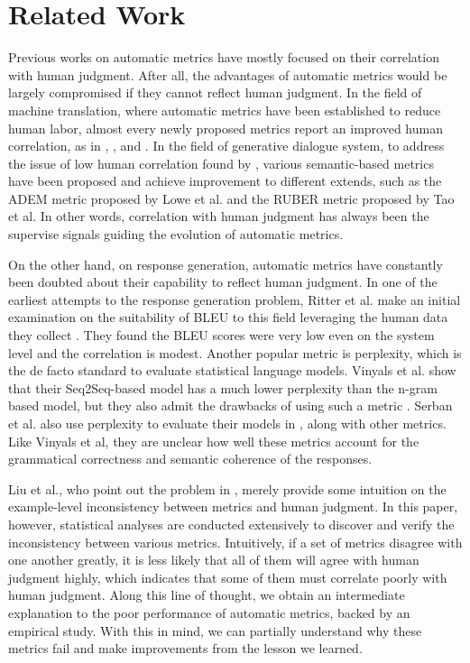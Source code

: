 \documentclass[runningheads]{llncs}
\begin{document}
    \section{Related Work}
    Previous works on automatic metrics have mostly focused on their correlation with human judgment. After all, the advantages of automatic metrics would be largely compromised if they cannot reflect human judgment. In the field of machine translation, where automatic metrics have been established to reduce human labor, almost every newly proposed metrics report an improved human correlation, as in \cite{NIST}, \cite{METEOR}, and \cite{chrf}. In the field of generative dialogue system, to address the issue of low human correlation found by \cite{HowNot}, various semantic-based metrics have been proposed and achieve improvement to different extends, such as the ADEM metric \cite{ADEM} proposed by Lowe et al. and the RUBER metric \cite{RUBER} proposed by Tao et al. In other words, correlation with human judgment has always been the supervise signals guiding the evolution of automatic metrics.

    On the other hand, on response generation, automatic metrics have constantly been doubted about their capability to reflect human judgment. In one of the earliest attempts to the response generation problem, Ritter et al. make an initial examination on the suitability of BLEU to this field leveraging the human data they collect \cite{Ritter11}. They found the BLEU scores were very low even on the system level and the correlation is modest. Another popular metric is perplexity, which is the de facto standard to evaluate statistical language models. Vinyals et al. show that their Seq2Seq-based model has a much lower perplexity than the n-gram based model, but they also admit the drawbacks of using such a metric \cite{GoogleChatbot}. Serban et al. also use perplexity to evaluate their models in \cite{HRED}, along with other metrics. Like Vinyals et al, they are unclear how well these metrics account for the grammatical correctness and semantic coherence of the responses.

    Liu et al., who point out the problem in \cite{HowNot}, merely provide some intuition on the example-level inconsistency between metrics and human judgment. In this paper, however, statistical analyses are conducted extensively to discover and verify the inconsistency between various metrics. Intuitively, if a set of metrics disagree with one another greatly, it is less likely that all of them will agree with human judgment highly, which indicates that some of them must correlate poorly with human judgment. Along this line of thought, we obtain an intermediate explanation to the poor performance of automatic metrics, backed by an empirical study. With this in mind, we can partially understand why these metrics fail and make improvements from the lesson we learned.
\end{document}
